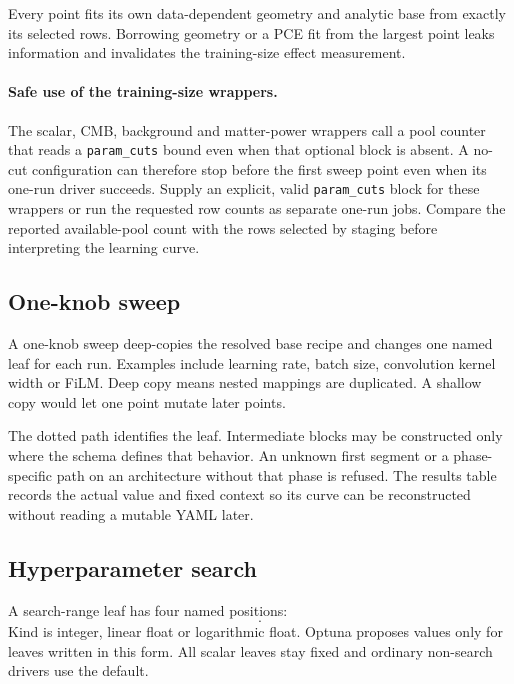 \documentclass[10pt,aps,prd,twocolumn,nofootinbib]{revtex4-2}
\newcommand{\code}[1]{\texttt{#1}}
\begin{document}
Every point fits its own data-dependent geometry and analytic base from exactly
its selected rows.  Borrowing geometry or a PCE fit from the largest point
leaks information and invalidates the training-size effect measurement.

\paragraph{Safe use of the training-size wrappers.}
The scalar, CMB, background and matter-power wrappers call a pool counter that
reads a \code{param\_cuts} bound even when that optional block is absent.  A
no-cut configuration can therefore stop before the first sweep point even
when its one-run driver succeeds.  Supply an explicit, valid
\code{param\_cuts} block for these wrappers or run the requested row counts as
separate one-run jobs.  Compare the reported available-pool count with the
rows selected by staging before interpreting the learning curve.

\subsection{One-knob sweep}

A one-knob sweep deep-copies the resolved base recipe and changes one named
leaf for each run.  Examples include learning rate, batch size, convolution
kernel width or FiLM.  Deep copy means nested mappings are duplicated.  A
shallow copy would let one point mutate later points.

The dotted path identifies the leaf.  Intermediate blocks may be constructed
only where the schema defines that behavior.  An unknown first segment or a
phase-specific path on an architecture without that phase is refused.  The
results table records the actual value and fixed context so its curve can be
reconstructed without reading a mutable YAML later.

\subsection{Hyperparameter search}

A search-range leaf has four named positions:
\begin{equation*}
 [\text{default},\text{minimum},\text{maximum},\text{kind}].
\end{equation*}
Kind is integer, linear float or logarithmic float.  Optuna proposes values
only for leaves written in this form.  All scalar leaves stay fixed and
ordinary non-search drivers use the default.
\end{document}
